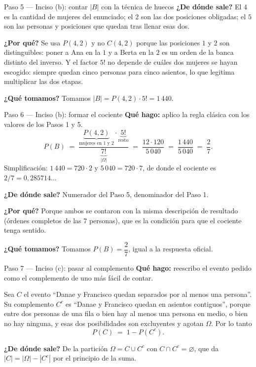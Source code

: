 \documentclass[11pt]{article}
\begin{document}
\begin{sol}
\begin{paso}{Paso 5 --- Inciso (b): contar $|B|$ con la t\'ecnica de huecos}
\textbf{¿De d\'onde sale?} El $4$ es la cantidad de mujeres del enunciado; el $2$ son las dos posiciones obligadas; el $5$ son las personas y posiciones que quedan tras llenar esas dos.

\textbf{¿Por qu\'e?} Se usa $P(4,2)$ y no $C(4,2)$ porque las posiciones $1$ y $2$ son distinguibles: poner a Ana en la $1$ y a Berta en la $2$ es un orden de la banca distinto del inverso. Y el factor $5!$ no depende de cu\'ales dos mujeres se hayan escogido: siempre quedan cinco personas para cinco asientos, lo que legitima multiplicar las dos etapas.

\textbf{¿Qu\'e tomamos?} Tomamos $|B|=P(4,2)\cdot 5!=1\,440$.
\end{paso}

\begin{paso}{Paso 6 --- Inciso (b): formar el cociente}
\textbf{Qu\'e hago:} aplico la regla cl\'asica con los valores de los Pasos 1 y 5.
\[
P(B)\;=\;\frac{\underbrace{P(4,2)}_{\text{mujeres en 1 y 2}}\cdot\underbrace{5!}_{\text{resto}}}{\underbrace{7!}_{|\Omega|}}
\;=\;\frac{12\cdot 120}{5\,040}\;=\;\frac{1\,440}{5\,040}\;=\;\frac{2}{7}.
\]
Simplificaci\'on: $1\,440=720\cdot 2$ y $5\,040=720\cdot 7$, de donde el cociente es $2/7=0{,}285714\ldots$

\textbf{¿De d\'onde sale?} Numerador del Paso 5, denominador del Paso 1.

\textbf{¿Por qu\'e?} Porque ambos se contaron con la misma descripci\'on de resultado (\'ordenes completos de las $7$ personas), que es la condici\'on para que el cociente tenga sentido.

\textbf{¿Qu\'e tomamos?} Tomamos $P(B)=\dfrac{2}{7}$, igual a la respuesta oficial.
\end{paso}

\begin{paso}{Paso 7 --- Inciso (c): pasar al complemento}
\textbf{Qu\'e hago:} reescribo el evento pedido como el complemento de uno m\'as f\'acil de contar.

Sea $C$ el evento ``Danae y Francisco quedan separados por al menos una persona''. Su complemento $C^{c}$ es ``Danae y Francisco quedan en asientos contiguos'', porque entre dos personas de una fila o bien hay al menos una persona en medio, o bien no hay ninguna, y esas dos posibilidades son excluyentes y agotan $\Omega$. Por lo tanto
\[
P(C) \;=\; 1-P(C^{c}).
\]

\textbf{¿De d\'onde sale?} De la partici\'on $\Omega=C\cup C^{c}$ con $C\cap C^{c}=\varnothing$, que da $|C|=|\Omega|-|C^{c}|$ por el principio de la suma.


\end{paso}
\end{sol}
\end{document}
